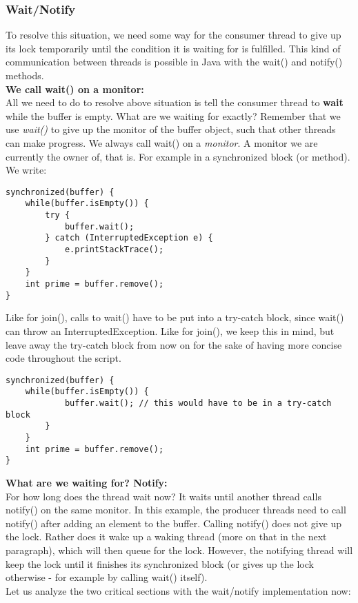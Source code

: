 \documentclass[main.tex]{subfiles}
\begin{document}
\subsubsection{Wait/Notify}
To resolve this situation, we need some way for the consumer thread to give up its lock temporarily until the condition it is waiting for is fulfilled. This kind of communication between threads is possible in Java with the wait() and notify() methods.\\[3mm]
\textbf{We call wait() on a monitor:}\\
All we need to do to resolve above situation is tell the consumer thread to \textbf{wait} while the buffer is empty. What are we waiting for exactly? Remember that we use \textit{wait()} to give up the monitor of the buffer object, such that other threads can make progress. We always call wait() on a \textit{monitor}. A monitor we are currently the owner of, that is. For example in a synchronized block (or method). We write:
\begin{verbatim}
synchronized(buffer) {
    while(buffer.isEmpty()) {
        try {
            buffer.wait();
        } catch (InterruptedException e) {
            e.printStackTrace();
        }
    }
    int prime = buffer.remove();
}
\end{verbatim}
Like for join(), calls to wait() have to be put into a try-catch block, since wait() can throw an InterruptedException. Like for join(), we keep this in mind, but leave away the try-catch block from now on for the sake of having more concise code throughout the script.
\begin{verbatim}
synchronized(buffer) {
    while(buffer.isEmpty()) {
            buffer.wait(); // this would have to be in a try-catch block
        }
    }
    int prime = buffer.remove();
}
\end{verbatim}
\textbf{What are we waiting for? Notify:}\\
For how long does the thread wait now? It waits until another thread calls notify() on the same monitor. In this example, the producer threads need to call notify() after adding an element to the buffer. Calling notify() does not give up the lock. Rather does it wake up a waking thread (more on that in the next paragraph), which will then queue for the lock. However, the notifying thread will keep the lock until it finishes its synchronized block (or gives up the lock otherwise - for example by calling wait() itself).\\
Let us analyze the two critical sections with the wait/notify implementation now:
\end{document}
